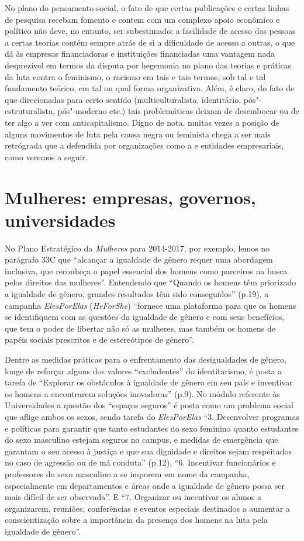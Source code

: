 No plano do pensamento social, o fato de que certas publicações e certas
linhas de pesquisa recebam fomento e contem com um complexo apoio
econômico e político não deve, no entanto, ser subestimado: a facilidade
de acesso das pessoas a certas teorias contém sempre atrás de si a
dificuldade de acesso a outras, o que dá às empresas financiadoras e
instituições financiadas uma vantagem nada desprezível em termos da
disputa por hegemonia no plano das teorias e práticas da luta contra o
feminismo, o racismo em tais e tais termos, sob tal e tal fundamento
teórico, em tal ou qual forma organizativa. Além, é claro, do fato de
que direcionadas para certo sentido (multiculturalista, identitário,
pós"-estruturalista, pós"-moderno etc.) tais problemáticas deixam de
desembocar ou de ter algo a ver com anticapitalismo. Digno de nota,
muitas vezes a posição de alguns movimentos de luta pela causa negra ou
feminista chega a ser mais retrógrada que a defendida por organizações
como a  e entidades empresariais, como veremos a seguir.

\chapter{ Mulheres: empresas, governos, universidades}

No Plano Estratégico da \emph{ Mulheres} para 2014-2017, por exemplo,
lemos no parágrafo 33C que ``alcançar a igualdade de gênero requer uma
abordagem inclusiva, que reconheça o papel essencial dos homens como
parceiros na busca pelos direitos das mulheres''. Entendendo que
``Quando os homens têm priorizado a igualdade de gênero, grandes
resultados têm sido conseguidos'' (p.19), a campanha \emph{ElesPorElas}
(\emph{HeForShe}) ``fornece uma plataforma para que os homens se
identifiquem com as questões da igualdade de gênero e com seus
benefícios, que tem o poder de libertar não só as mulheres, mas também
os homens de papéis sociais prescritos e de estereótipos de gênero''.

Dentre as medidas práticas para o enfrentamento das desigualdades de
gênero, longe de reforçar alguns dos valores ``excludentes'' do
identitarismo, é posta a tarefa de ``Explorar os obstáculos à igualdade
de gênero em seu país e incentivar os homens a encontrarem soluções
inovadoras'' (p.9). No módulo referente às Universidades a questão dos
``espaços seguros'' é posta como um problema social que aflige ambos os
sexos, sendo tarefa do \emph{ElesPorElas} ``3. Desenvolver programas e
políticas para garantir que tanto estudantes do sexo feminino quanto
estudantes do sexo masculino estejam seguros no campus, e medidas de
emergência que garantam o seu acesso à justiça e que sua dignidade e
direitos sejam respeitados no caso de agressão ou de má conduta''
(p.12), ``6. Incentivar funcionários e professores do sexo masculino a
se imporem em nome da campanha, especialmente em departamentos e áreas
onde a igualdade de gênero possa ser mais difícil de ser observada''. E
``7. Organizar ou incentivar os alunos a organizarem, reuniões,
conferências e eventos especiais destinados a aumentar a conscientização
sobre a importância da presença dos homens na luta pela igualdade de
gênero''.

